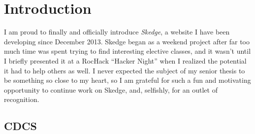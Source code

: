 
\chapter{Introduction}


\onehalfspacing
{\small
I am proud to finally and officially introduce \emph{Skedge}, a website I have been developing since December 2013. Skedge began as a weekend project after far too much time was spent trying to find interesting elective classes, and it wasn't until I briefly presented it at a RocHack ``Hacker Night'' when I realized the potential it had to help others as well. 
I never expected the subject of my senior thesis to be something so close to my heart, so I am grateful for such a fun and motivating opportunity to continue work on Skedge, and, selfishly, for an outlet of recognition.
}

\doublespacing

\section{CDCS}


